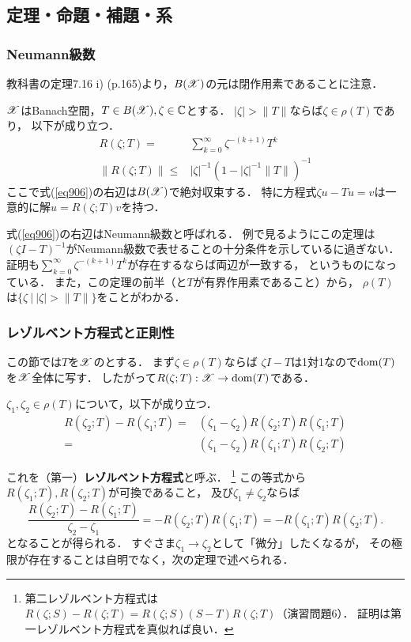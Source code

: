     \subsection{定理・命題・補題・系}
    \subsubsection{Neumann級数}
    教科書の定理7.16 i) (p.165)より，$B(\mathscr{X})$の元は閉作用素であることに注意．

    \begin{Them}[定理9.2, p.209] \label{them902}
        $\mathscr{X}$はBanach空間，$T \in B(\mathscr{X}), \zeta \in \mathbb{C}$とする．
        $|\zeta| > \|T\|$ならば$\zeta \in \rho(T)$であり，
        以下が成り立つ．
        \begin{align}
            R(\zeta; T)=&\sum_{k=0}^{\infty} \zeta^{-(k+1)} T^k \label{eq906}\\
            \|R(\zeta; T)\| \leq& |\zeta|^{-1} (1-|\zeta|^{-1} \|T\|)^{-1}
        \end{align}
        ここで式(\ref{eq906})の右辺は$B(\mathscr{X})$で絶対収束する．
        特に方程式$\zeta u-Tu=v$は一意的に解$u=R(\zeta;T)v$を持つ．
    \end{Them}
    式(\ref{eq906})の右辺はNeumann級数と呼ばれる．
    例で見るようにこの定理は$(\zeta I-T)^{-1}$がNeumann級数で表せることの十分条件を示しているに過ぎない．
    証明も$\sum_{k=0}^{\infty} \zeta^{-(k+1)} T^k$が存在するならば両辺が一致する，
    というものになっている．
    また，この定理の前半（と$T$が有界作用素であること）から，
    $\rho(T)$は$\{ \zeta ~|~ |\zeta| > \|T\| \}$をことがわかる．

    \subsubsection{レゾルベント方程式と正則性}
    この節では$T$を$\mathscr{X}$のとする．
    まず$\zeta \in \rho(T)$ならば
    $\zeta I-T$は1対1なので$\operatorname{dom}(T)$を$\mathscr{X}$全体に写す．
    したがって$R(\zeta;T):\mathscr{X} \to \operatorname{dom}(T)$である．

    \begin{Them}
        $\zeta_1, \zeta_2 \in \rho(T)$について，以下が成り立つ．
        \begin{align*}
            R(\zeta_2;T)-R(\zeta_1;T)
            =&(\zeta_1-\zeta_2)R(\zeta_2;T)R(\zeta_1;T) \\
            =&(\zeta_1-\zeta_2)R(\zeta_1;T)R(\zeta_2;T)
        \end{align*}
    \end{Them}
    これを（第一）\textbf{レゾルベント方程式}と呼ぶ．
    \footnote
    {
        第二レゾルベント方程式は$R(\zeta;S)-R(\zeta;T)=R(\zeta;S)(S-T)R(\zeta;T)$（演習問題6）．
        証明は第一レゾルベント方程式を真似れば良い．
    }
    この等式から$R(\zeta_1;T), R(\zeta_2;T)$が可換であること，
    及び$\zeta_1 \neq \zeta_2$ならば
    \[ \frac{R(\zeta_2;T)-R(\zeta_1;T)}{\zeta_2-\zeta_1}=-R(\zeta_2;T)R(\zeta_1;T)=-R(\zeta_1;T)R(\zeta_2;T). \label{eq-ori901} \]
    となることが得られる．
    すぐさま$\zeta_1 \to \zeta_2$として「微分」したくなるが，
    その極限が存在することは自明でなく，次の定理で述べられる．

